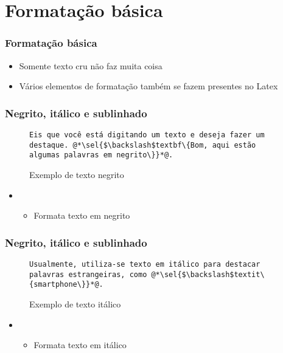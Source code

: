 \section{Formatação básica}

\begin{frame}[fragile] \frametitle{Formatação básica}
\begin{itemize}
	\item Somente texto cru não faz muita coisa
	\item Vários elementos de formatação também se fazem presentes no Latex
\end{itemize}
\end{frame}

\begin{frame}[fragile] \frametitle{Negrito, itálico e sublinhado}
\begin{figure}[!t]
\caption{Exemplo de texto negrito}
\begin{lstlisting}
Eis que você está digitando um texto e deseja fazer um destaque. @*\sel{$\backslash$textbf\{Bom, aqui estão algumas palavras em negrito\}}*@.
\end{lstlisting}
\ownsrc
\end{figure}

\begin{itemize}
	\item {}
	\begin{itemize}
		\item Formata texto em negrito
	\end{itemize}
\end{itemize}
\end{frame}

\begin{frame}[fragile] \frametitle{Negrito, itálico e sublinhado}
\begin{figure}[!t]
\caption{Exemplo de texto itálico}
\begin{lstlisting}
Usualmente, utiliza-se texto em itálico para destacar palavras estrangeiras, como @*\sel{$\backslash$textit\{smartphone\}}*@.
\end{lstlisting}
\ownsrc
\end{figure}

\begin{itemize}
	\item {}
	\begin{itemize}
		\item Formata texto em itálico
	\end{itemize}
\end{itemize}
\end{frame}

